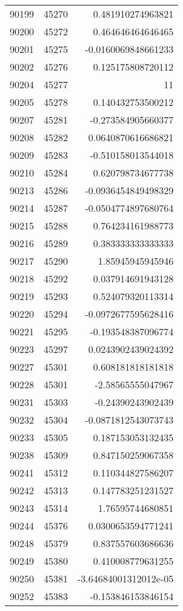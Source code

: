 \begin{tabular}{r | r | r}
90199 & 45270 & 0.481910274963821 \\
90200 & 45272 & 0.464646464646465 \\
90201 & 45275 & -0.0160069848661233 \\
90202 & 45276 & 0.125175808720112 \\
90204 & 45277 & 11 \\
90205 & 45278 & 0.140432753500212 \\
90207 & 45281 & -0.273584905660377 \\
90208 & 45282 & 0.0640870616686821 \\
90209 & 45283 & -0.510158013544018 \\
90210 & 45284 & 0.620798734677738 \\
90213 & 45286 & -0.0936454849498329 \\
90214 & 45287 & -0.0504774897680764 \\
90215 & 45288 & 0.764234161988773 \\
90216 & 45289 & 0.383333333333333 \\
90217 & 45290 & 1.85945945945946 \\
90218 & 45292 & 0.037914691943128 \\
90219 & 45293 & 0.524079320113314 \\
90220 & 45294 & -0.0972677595628416 \\
90221 & 45295 & -0.193548387096774 \\
90223 & 45297 & 0.0243902439024392 \\
90227 & 45301 & 0.608181818181818 \\
90228 & 45301 & -2.58565555047967 \\
90231 & 45303 & -0.24390243902439 \\
90232 & 45304 & -0.0871812543073743 \\
90233 & 45305 & 0.187153053132435 \\
90238 & 45309 & 0.847150259067358 \\
90241 & 45312 & 0.110344827586207 \\
90242 & 45313 & 0.147783251231527 \\
90243 & 45314 & 1.76595744680851 \\
90244 & 45376 & 0.0300653594771241 \\
90248 & 45379 & 0.837557603686636 \\
90249 & 45380 & 0.410008779631255 \\
90250 & 45381 & -3.64684001312012e-05 \\
90252 & 45383 & -0.153846153846154 \\

\end{tabular}
